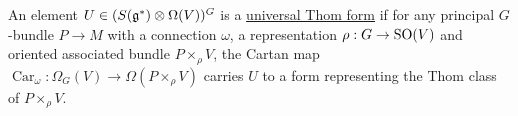 \begin{defn} 
	An element $U\in (S(\operatorname{\mathfrak{g}}^*)\otimes \Omega(V))^G$ is a
	\underline{universal Thom form} if for any principal $G$-bundle $P\to M$ 
	with a connection $\omega$, a representation $\rho : G\to \operatorname{SO}(V)$ and oriented
	associated bundle $P\times_\rho V$, the
	Cartan map $\operatorname{Car}_{\omega} : \Omega_{G}(V) \to
	\Omega(P\times_\rho V)$
	carries $U$ to a form representing the Thom class of $P\times_\rho V$.

\end{defn} 

